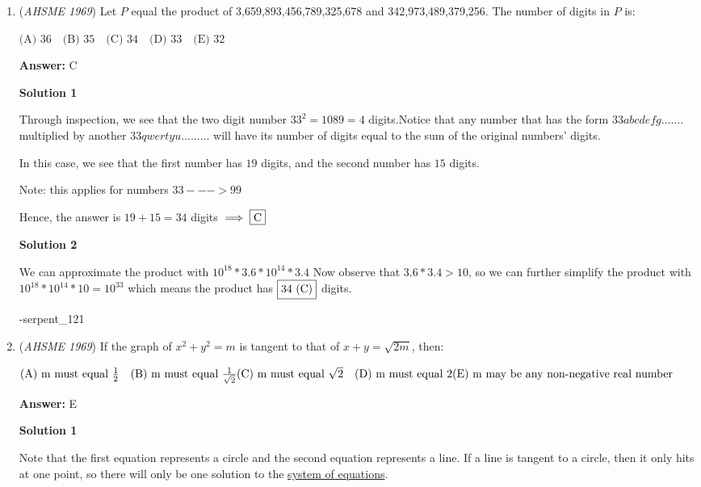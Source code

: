 \begin{enumerate}
 


	\item (\textit{AHSME 1969}) Let $P$ equal the product of 3,659,893,456,789,325,678 and 342,973,489,379,256. The number of digits in $P$ is:


 $\text{(A) } 36\quad \text{(B) } 35\quad \text{(C) } 34\quad \text{(D) } 33\quad \text{(E) } 32$

 \textbf{Answer: }C



\textbf{Solution 1}

Through inspection, we see that the two digit number $33^{2}=1089=4$ digits.Notice that any number that has the form $33abcdefg.......$ multiplied by another $33qwertyu.........$ will have its number of digits equal to the sum of the original numbers' digits.

 In this case, we see that the first number has $19$ digits, and the second number has $15$ digits.

 Note: this applies for numbers $33--->99$

 Hence, the answer is $19+15=34$ digits $\implies \fbox{C}$




\textbf{Solution 2}

We can approximate the product with $10^{18} * 3.6 *10^{14} *3.4$ Now observe that $3.6*3.4>10$, so we can further simplify the product with $10^{18}*10^{14}*10=10^{33}$ which means the product has $\fbox{34 (C)}$ digits.

 -serpent\_121

 


	\item (\textit{AHSME 1969}) If the graph of $x^2+y^2=m$ is tangent to that of $x+y=\sqrt{2m}$, then:


 $\text{(A) m must equal } \frac{1}{2}\quad \text{(B) m must equal  } \frac{1}{\sqrt{2}}\quad\\ \text{(C) m must equal } \sqrt{2}\quad \text{(D) m must equal } 2\quad\\ \text{(E) m may be any non-negative real number}$

 \textbf{Answer: }E



\textbf{Solution 1}

Note that the first equation represents a circle and the second equation represents a line.  If a line is tangent to a circle, then it only hits at one point, so there will only be one solution to the \href{https://artofproblemsolving.com/wiki/index.php?title=System\_of\_equations}{system of equations}.


\end{enumerate}
